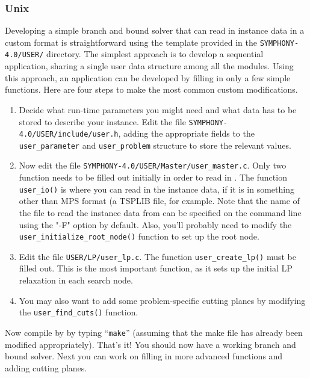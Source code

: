 \subsubsection{Unix}

Developing a simple branch and bound solver that can read in instance data in
a custom format is straightforward using the template provided in the
\texttt{SYMPHONY-4.0/USER/} directory. The simplest approach is to develop a 
sequential application, sharing a single user data structure among all the
modules. Using this approach, an application can be developed by filling in
only a few simple functions. Here are four steps to make the most common
custom modifications.

\begin{enumerate}

\item Decide what run-time parameters you might need and what data has 
to be stored to describe your instance. Edit the file
\texttt{SYMPHONY-4.0/USER/include/user.h}, adding the appropriate fields to the
\texttt{user\_parameter} and \texttt{user\_problem} structure to store the
relevant values.

\item Now edit the file \texttt{SYMPHONY-4.0/USER/Master/user\_master.c}. Only two
function needs to be filled out initially in order to read in . The function
\texttt{user\_io()} is where you can read in the instance data, if it is in
something other than MPS format (a TSPLIB file, for example. Note that the
name of the file to read the instance data from can be specified on the
command line using the "-F" option by default. Also, you'll probably need to
modify the \texttt{user\_initialize\_root\_node()} function to set up the root
node. 

\item Edit the file \texttt{USER/LP/user\_lp.c}. The function
\texttt{user\_create\_lp()} must be filled out. This is the most important
function, as it sets up the initial LP relaxation in each search node.

\item You may also want to add some problem-specific cutting planes by modifying
the \texttt{user\_find\_cuts()} function.

\end{enumerate}

Now compile by by typing ``\texttt{make}'' (assuming that the make
file has already been modified appropriately). That's it! You should now have
a working branch and bound solver. Next you can work on filling in more
advanced functions and adding cutting planes.

